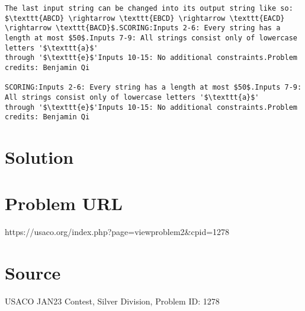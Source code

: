 \documentclass[12pt]{article}
\begin{document}
\begin{verbatim}
The last input string can be changed into its output string like so:
$\texttt{ABCD} \rightarrow \texttt{EBCD} \rightarrow \texttt{EACD} \rightarrow \texttt{BACD}$.SCORING:Inputs 2-6: Every string has a length at most $50$.Inputs 7-9: All strings consist only of lowercase letters '$\texttt{a}$'
through '$\texttt{e}$'Inputs 10-15: No additional constraints.Problem credits: Benjamin Qi

SCORING:Inputs 2-6: Every string has a length at most $50$.Inputs 7-9: All strings consist only of lowercase letters '$\texttt{a}$'
through '$\texttt{e}$'Inputs 10-15: No additional constraints.Problem credits: Benjamin Qi
\end{verbatim}

\section*{Solution}


\section*{Problem URL}
https://usaco.org/index.php?page=viewproblem2&cpid=1278

\section*{Source}
USACO JAN23 Contest, Silver Division, Problem ID: 1278
\end{document}
